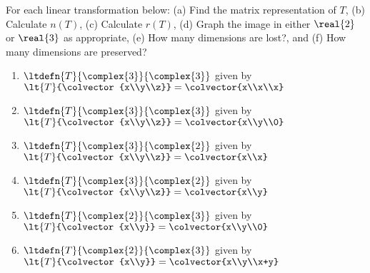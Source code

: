 For each linear transformation below:
(a) Find the matrix representation of $T$,
(b) Calculate $n(T)$,
(c) Calculate $r(T)$,
(d) Graph the image in either $\real{2}$ or $\real{3}$ as appropriate,
(e) How many dimensions are lost?, and
(f) How many dimensions are preserved?
%
\begin{enumerate}
\item $\ltdefn{T}{\complex{3}}{\complex{3}}$ given by 
$\lt{T}{\colvector{x\\y\\z}} = \colvector{x\\x\\x}$\\
%
\item $\ltdefn{T}{\complex{3}}{\complex{3}}$ given by 
$\lt{T}{\colvector{x\\y\\z}} = \colvector{x\\y\\0}$\\
%
\item $\ltdefn{T}{\complex{3}}{\complex{2}}$ given by 
$\lt{T}{\colvector{x\\y\\z}} = \colvector{x\\x}$\\
%
\item $\ltdefn{T}{\complex{3}}{\complex{2}}$ given by 
$\lt{T}{\colvector{x\\y\\z}} = \colvector{x\\y}$\\
%
\item $\ltdefn{T}{\complex{2}}{\complex{3}}$ given by
$\lt{T}{\colvector{x\\y}} = \colvector{x\\y\\0}$\\
%
\item $\ltdefn{T}{\complex{2}}{\complex{3}}$ given by 
$\lt{T}{\colvector{x\\y}} = \colvector{x\\y\\x+y}$\\
\end{enumerate}

